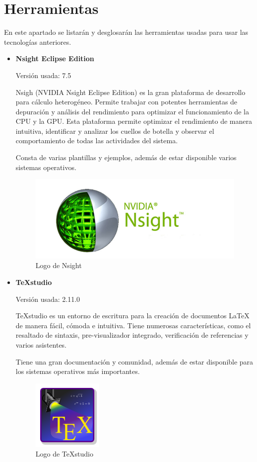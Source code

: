 	
	

\newpage
\section{Herramientas}

En este apartado se listarán y desglosarán las herramientas usadas para usar las tecnologías anteriores.


\begin{itemize}
	\item \textbf{Nsight Eclipse Edition}
	
	Versión usada: 7.5
		
	Nsigh (NVIDIA Nsight Eclipse Edition) \cite{nsight} es la gran plataforma de desarrollo para cálculo heterogéneo. Permite trabajar con potentes herramientas de depuración y análisis del rendimiento para optimizar el funcionamiento de la CPU y la GPU. Esta plataforma permite optimizar el rendimiento de manera intuitiva, identificar y analizar los cuellos de botella y observar el comportamiento de todas las actividades del sistema.

	Consta de varias plantillas y ejemplos, además de estar disponible varios sistemas operativos.
 
	\bigskip
	\begin{figure}[h]
		\centering
		\includegraphics[width=0.5\linewidth]{../images/nsightlogo}
		\caption[Logo de Nsight]{Logo de Nsight}
		\label{fig:nsightlogo}
	\end{figure}
	
	\item \textbf{TeXstudio}
		
		Versión usada: 2.11.0
		
	TeXstudio \cite{texstudio} es un entorno de escritura para la creación de documentos LaTeX de manera fácil, cómoda e intuitiva. Tiene numerosas características, como el resaltado de sintaxis, pre-visualizador integrado, verificación de referencias y varios asistentes. 

	Tiene una gran documentación y comunidad, además de estar disponible para los sistemas operativos más importantes.
		
	\bigskip
	\begin{figure}[h]
		\centering
		\includegraphics[width=0.3\linewidth]{../images/texstudiologo}
		\caption[Logo de TeXstudio]{Logo de TeXstudio}
		\label{fig:texstudiologo}
	\end{figure}
			

\end{itemize}
